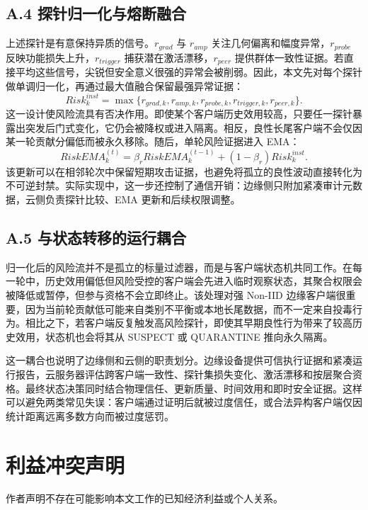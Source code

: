 \documentclass[11pt, a4paper, UTF8, fontset=fandol]{ctexart}
\begin{document}
\subsection{A.4 探针归一化与熔断融合}
上述探针是有意保持异质的信号。$r_{grad}$ 与 $r_{amp}$ 关注几何偏离和幅度异常，$r_{probe}$ 反映功能损失上升，$r_{trigger}$ 捕获潜在激活漂移，$r_{peer}$ 提供群体一致性证据。若直接平均这些信号，尖锐但安全意义很强的异常会被削弱。因此，本文先对每个探针做单调归一化，再通过最大值融合保留最强异常证据：
\begin{equation}
    Risk_k^{inst}=\max\{r_{grad,k},r_{amp,k},r_{probe,k},r_{trigger,k},r_{peer,k}\}.
\end{equation}
这一设计使风险流具有否决作用。即使某个客户端历史效用较高，只要任一探针暴露出突发后门式变化，它仍会被降权或进入隔离。相反，良性长尾客户端不会仅因某一轮贡献分偏低而被永久移除。随后，单轮风险证据进入 EMA：
\begin{equation}
    RiskEMA_{k}^{(t)}=\beta_r RiskEMA_{k}^{(t-1)}+(1-\beta_r)Risk_{k}^{inst}.
\end{equation}
该更新可以在相邻轮次中保留短期攻击证据，也避免将孤立的良性波动直接转化为不可逆封禁。实际实现中，这一步还控制了通信开销：边缘侧只附加紧凑审计元数据，云侧负责探针比较、EMA 更新和后续权限调整。

\subsection{A.5 与状态转移的运行耦合}
归一化后的风险流并不是孤立的标量过滤器，而是与客户端状态机共同工作。在每一轮中，历史效用偏低但风险受控的客户端会先进入临时观察状态，其聚合权限会被降低或暂停，但参与资格不会立即终止。该处理对强 Non-IID 边缘客户端很重要，因为当前轮贡献低可能来自类别不平衡或本地长尾数据，而不一定来自投毒行为。相比之下，若客户端反复触发高风险探针，即使其早期良性行为带来了较高历史效用，状态机也会将其从 SUSPECT 或 QUARANTINE 推向永久隔离。

这一耦合也说明了边缘侧和云侧的职责划分。边缘设备提供可信执行证据和紧凑运行报告，云服务器评估跨客户端一致性、探针集损失变化、激活漂移和按层聚合资格。最终状态决策同时结合物理信任、更新质量、时间效用和即时安全证据。这样可以避免两类常见失误：客户端通过证明后就被过度信任，或合法异构客户端仅因统计距离远离多数方向而被过度惩罚。

\section*{利益冲突声明}
作者声明不存在可能影响本文工作的已知经济利益或个人关系。
\end{document}
